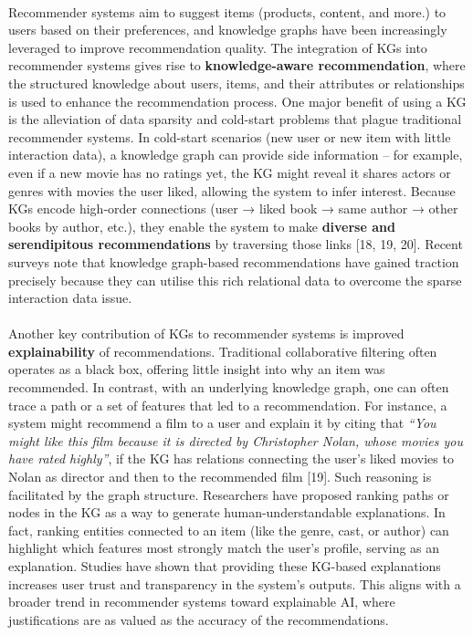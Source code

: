         \paragraph{} Recommender systems aim to suggest items (products, content, and more.) to users based on their preferences, and knowledge graphs have been increasingly leveraged to improve recommendation quality. The integration of KGs into recommender systems gives rise to \textbf{knowledge-aware recommendation}, where the structured knowledge about users, items, and their attributes or relationships is used to enhance the recommendation process. One major benefit of using a KG is the alleviation of data sparsity and cold-start problems that plague traditional recommender systems. In cold-start scenarios (new user or new item with little interaction data), a knowledge graph can provide side information – for example, even if a new movie has no ratings yet, the KG might reveal it shares actors or genres with movies the user liked, allowing the system to infer interest. Because KGs encode high-order connections (user → liked book → same author → other books by author, etc.), they enable the system to make \textbf{diverse and serendipitous recommendations} by traversing those links [18, 19, 20]. Recent surveys note that knowledge graph-based recommendations have gained traction precisely because they can utilise this rich relational data to overcome the sparse interaction data issue.

        \newpage
        \paragraph{} Another key contribution of KGs to recommender systems is improved \textbf{explainability} of recommendations. Traditional collaborative filtering often operates as a black box, offering little insight into why an item was recommended. In contrast, with an underlying knowledge graph, one can often trace a path or a set of features that led to a recommendation. For instance, a system might recommend a film to a user and explain it by citing that \textit{“You might like this film because it is directed by Christopher Nolan, whose movies you have rated highly”}, if the KG has relations connecting the user’s liked movies to Nolan as director and then to the recommended film [19]. Such reasoning is facilitated by the graph structure. Researchers have proposed ranking paths or nodes in the KG as a way to generate human-understandable explanations. In fact, ranking entities connected to an item (like the genre, cast, or author) can highlight which features most strongly match the user’s profile, serving as an explanation. Studies have shown that providing these KG-based explanations increases user trust and transparency in the system’s outputs. This aligns with a broader trend in recommender systems toward explainable AI, where justifications are as valued as the accuracy of the recommendations.

